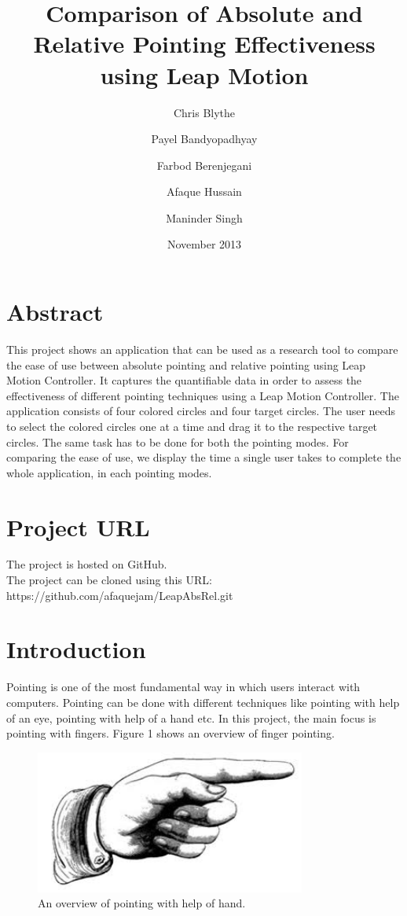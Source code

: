 \documentclass{article}
\title{Comparison of Absolute and Relative Pointing Effectiveness using Leap Motion}
\author{ Chris Blythe \and Payel Bandyopadhyay \and Farbod Berenjegani \and Afaque Hussain \and Maninder Singh}
\date{November  2013}
\begin{document}
\maketitle

\section{Abstract}
This project shows an application that can be used as a research tool to compare the ease of use between absolute pointing and relative pointing using Leap Motion Controller. It captures the quantifiable data in order to assess the effectiveness of different pointing techniques using a Leap Motion Controller. The application consists of four colored circles and four target circles. The user needs to select the colored circles one at a time and drag it to the respective target circles. The same task has to be done for both the pointing modes. For comparing the ease of use, we display the time a single user takes to complete the whole application, in each pointing modes.

\section{Project URL}
The project is hosted on GitHub. \\
The project can be cloned using this URL: https://github.com/afaquejam/LeapAbsRel.git  


\section{Introduction}
Pointing is one of the most fundamental way in which users interact with computers. Pointing can be done with different techniques like pointing with help of an eye, pointing with help of a hand etc. In this project, the main focus is pointing with fingers. Figure 1 shows an overview of finger pointing.

\begin{figure}[!h]
\centering
\includegraphics[width=3.5in]{Figure_1}
\caption{An overview of pointing with help of hand.}
\end{figure}
\end{document}
